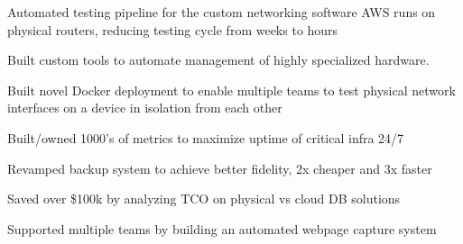 \documentclass[]{resume}
\begin{document}
\begin{minipage}[t]{1.0\textwidth}
\begin{tightemize}
\item Automated testing pipeline for the custom networking software AWS runs on physical routers, reducing testing cycle from weeks to hours
\item Built custom tools to automate management of highly specialized hardware.

\columnbreak

\item Built novel Docker deployment to enable multiple teams to test physical network interfaces on a device in isolation from each other
\end{tightemize}
\sectionsep

\begin{tightemize}
\item Built/owned 1000's of metrics to maximize uptime of critical infra 24/7
\item Revamped backup system to achieve better fidelity, 2x cheaper and 3x faster
\item Saved over \$100k by analyzing TCO on physical vs cloud DB solutions
\item Supported multiple teams by building an automated webpage capture system
\end{tightemize}
\sectionsep
\end{minipage}


\let\clearpage\relax
\end{document}
